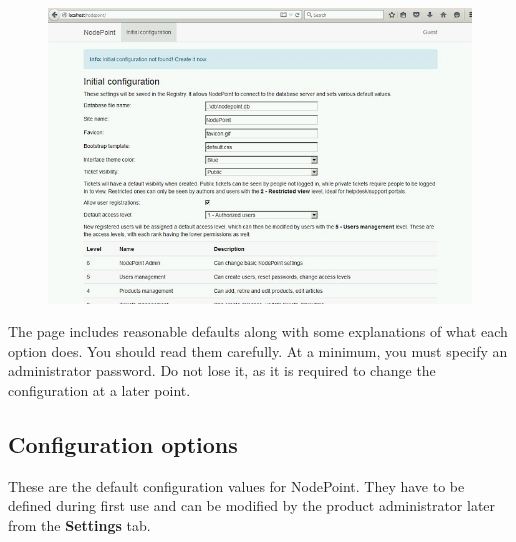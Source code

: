 \documentclass[11pt]{article}
\begin{document}
\begin{figure}[h]
\includegraphics{initial.jpg}
\end{figure}

The page includes reasonable defaults along with some explanations of what each option does. You should read them carefully. At a minimum, you must specify an administrator password. Do not lose it, as it is required to change the configuration at a later point.

\subsection{Configuration options}

These are the default configuration values for NodePoint. They have to be defined during first use and can be modified by the product administrator later from the \textbf{Settings} tab.
\end{document}
